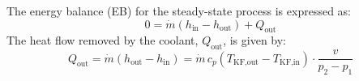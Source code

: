 The energy balance (EB) for the steady-state process is expressed as:  
\[
0 = \dot{m} \left( h_{\text{in}} - h_{\text{out}} \right) + Q_{\text{out}}
\]  
The heat flow removed by the coolant, \( Q_{\text{out}} \), is given by:  
\[
Q_{\text{out}} = \dot{m} \left( h_{\text{out}} - h_{\text{in}} \right) = \dot{m} \, c_{p} \left( T_{\text{KF,out}} - T_{\text{KF,in}} \right) \cdot \frac{v}{p_2 - p_1}
\]